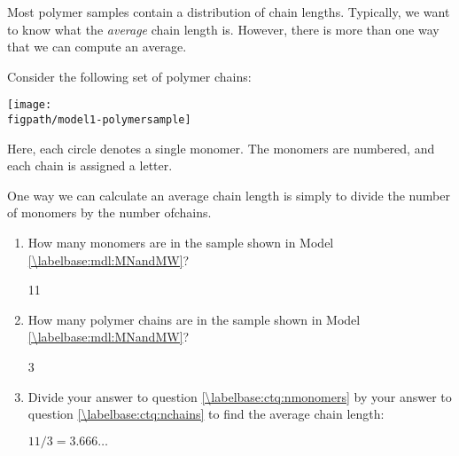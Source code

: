 \begin{activity}
\begin{instructornotes}
\end{instructornotes}

\begin{model}
\label{\labelbase:mdl:MNandMW}

	Most polymer samples contain a distribution of chain lengths.  Typically, we want to know what the \emph{average} chain length is.  However, there is more than one way that we can compute an average.
	
	Consider the following set of polymer chains:
	
		\vspace{6pt}
		\centerline{\texttt{[image: \\figpath/model1-polymersample]}}
	
	Here, each circle denotes a single monomer.  The monomers are numbered, and each chain is assigned a letter.

\end{model}

\vspace{0.05in}
\begin{ctqs}

	\question One way we can calculate an average chain length is simply to divide the number of monomers by the number ofchains.
	
		\begin{enumerate}
		
			\item How many monomers are in the sample shown in Model \ref{\labelbase:mdl:MNandMW}?
				\label{\labelbase:ctq:nmonomers}
	
				\begin{solution}[0.5in]
					11
				\end{solution}
	
			\item How many polymer chains are in the sample shown in Model  \ref{\labelbase:mdl:MNandMW}?
				\label{\labelbase:ctq:nchains}
	
				\begin{solution}[0.5in]
					3
				\end{solution}
				
			\item Divide your answer to question \ref{\labelbase:ctq:nmonomers} by your answer to question \ref{\labelbase:ctq:nchains} to find the average chain length:
				\label{\labelbase:ctq:Mnsimple}
	
				\begin{solution}[0.75in]
					$11/3 = 3.666\dots$
				\end{solution}
				

\end{enumerate}
\end{ctqs}
\end{activity}
